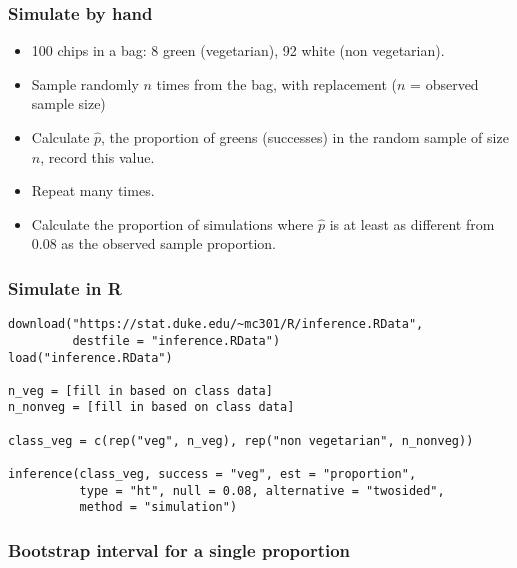 \documentclass[slidestop,compress,mathserif,12pt,t,professionalfonts,xcolor=table]{beamer}
\begin{document}
\begin{frame}
\frametitle{Simulate by hand}


\pause

\begin{itemize}
\item 100 chips in a bag: 8 green (vegetarian), 92 white (non vegetarian).
\pause
\item Sample randomly $n$ times from the bag, with replacement ($n$ = observed sample size)
\pause
\item Calculate $\hat{p}$, the proportion of greens (successes) in the random sample of size $n$, record this value.
\pause
\item Repeat many times.
\pause
\item Calculate the proportion of simulations where $\hat{p}$ is at least as different from 0.08 as the observed sample proportion.
\end{itemize}

\end{frame}


\begin{frame}[fragile]
\frametitle{Simulate in R}

{\footnotesize
\begin{verbatim}
download("https://stat.duke.edu/~mc301/R/inference.RData", 
         destfile = "inference.RData")
load("inference.RData")

n_veg = [fill in based on class data]
n_nonveg = [fill in based on class data]

class_veg = c(rep("veg", n_veg), rep("non vegetarian", n_nonveg))

inference(class_veg, success = "veg", est = "proportion", 
          type = "ht", null = 0.08, alternative = "twosided", 
          method = "simulation")
\end{verbatim}
}


\end{frame}


\begin{frame}
\frametitle{Bootstrap interval for a single proportion}

\vfill


\vfill

\end{frame}
\end{document}
